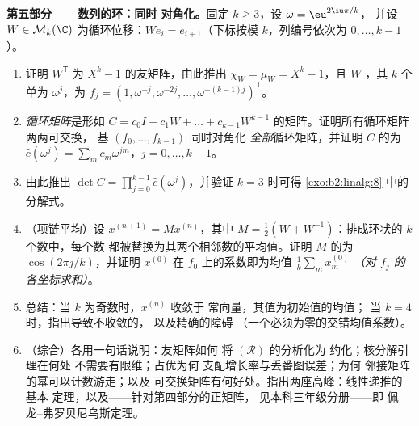 \begin{problem}
\medskip
\noindent\textbf{第五部分——数列的环：同时
对角化。}固定 $k \geq 3$，设 $\omega = \eu^{2\iu\pi/k}$，
        并设 $W \in \mathcal{M}_k(\C)$ 为循环位移：$W e_i =
e_{i+1}$（下标按模 $k$，列编号依次为 $0, \dots, k-1$）。
\begin{enumerate}[resume]
  \item 证明 $W^{\mathsf T}$ 为
        $X^k - 1$ 的友矩阵，由此推出 $\chi_W = \mu_W = X^k - 1$，且 $W$
        ，其 $k$ 个单为
        $\omega^j$，为 $f_j = (1, \omega^{-j},
        \omega^{-2j}, \dots, \omega^{-(k-1)j})^{\mathsf T}$。
  \item \emph{循环矩阵}是形如 $C = c_0 I + c_1 W + \dots
        + c_{k-1}W^{k-1}$ 的矩阵。证明所有循环矩阵两两可交换，
        基 $(f_0, \dots, f_{k-1})$ 同时对角化
        \emph{全部}循环矩阵，并证明
        $C$ 的为 $\widehat c(\omega^j) = \sum_m
        c_m \omega^{jm}$，$j = 0, \dots, k-1$。
  \item 由此推出 $\det C = \prod_{j=0}^{k-1} \widehat
        c(\omega^j)$，并验证 $k = 3$ 时可得
        \cref{exo:b2:linalg:8} 中的分解式。
  \item （项链平均）设 $x^{(n+1)} = Mx^{(n)}$，其中
        $M = \frac12(W + W^{-1})$：排成环状的 $k$ 个数中，每个数
        都被替换为其两个相邻数的平均值。证明
        $M$ 的为
        $\cos(2\pi j/k)$，并证明 $x^{(0)}$ 在
        $f_0$ 上的系数即为均值 $\frac1k\sum_m x^{(0)}_m$
        \emph{（对 $f_j$ 的各坐标求和）}。
  \item 总结：当 $k$ 为奇数时，$x^{(n)}$ 收敛于
        常向量，其值为初始值的均值；
        当 $k = 4$ 时，指出导致不收敛的，
        以及精确的障碍
        （一个必须为零的交错均值系数）。
  \item （综合）各用一句话说明：友矩阵如何
        将 $(\mathcal R)$ 的分析化为
        约化；核分解引理在何处
        不需要有限维；占优为何
        支配增长率与丢番图误差；为何
        邻接矩阵的幂可以计数游走；以及
        可交换矩阵有何好处。指出两座高峰：线性递推的基本
        定理，以及——针对第四部分的正矩阵，
        见本科三年级分册——即
        佩龙--弗罗贝尼乌斯定理。
\end{enumerate}
\end{problem}
